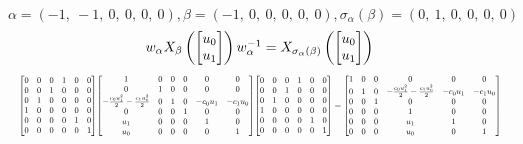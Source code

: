 \documentclass[11pt]{article}
\theoremstyle{definition}
\begin{document}
\[
\alpha = \left( -1, \  -1, \  0, \  0, \  0, \  0\right), \beta = \left( -1, \  0, \  0, \  0, \  0, \  0\right), \sigma_{\alpha}(\beta) = \left( 0, \  1, \  0, \  0, \  0, \  0\right)
\]
\[
\scaletoalign{\textwidth}{w_{\alpha} X_{\beta}\left(\left[\begin{matrix}u_{0}\\u_{1}\end{matrix}\right]\right) w_{\alpha}^{-1} = X_{\sigma_{\alpha}\left(\beta\right)}\left(\left[\begin{matrix}u_{0}\\u_{1}\end{matrix}\right]\right)}
\]
\[
\scaletoalign{\textwidth}{{\left[\begin{matrix}0 & 0 & 0 & 1 & 0 & 0\\0 & 0 & 1 & 0 & 0 & 0\\0 & 1 & 0 & 0 & 0 & 0\\1 & 0 & 0 & 0 & 0 & 0\\0 & 0 & 0 & 0 & 1 & 0\\0 & 0 & 0 & 0 & 0 & 1\end{matrix}\right]} {\left[\begin{matrix}1 & 0 & 0 & 0 & 0 & 0\\0 & 1 & 0 & 0 & 0 & 0\\- \frac{c_{0} u_{1}^{2}}{2} - \frac{c_{1} u_{0}^{2}}{2} & 0 & 1 & 0 & - c_{0} u_{1} & - c_{1} u_{0}\\0 & 0 & 0 & 1 & 0 & 0\\u_{1} & 0 & 0 & 0 & 1 & 0\\u_{0} & 0 & 0 & 0 & 0 & 1\end{matrix}\right]} {\left[\begin{matrix}0 & 0 & 0 & 1 & 0 & 0\\0 & 0 & 1 & 0 & 0 & 0\\0 & 1 & 0 & 0 & 0 & 0\\1 & 0 & 0 & 0 & 0 & 0\\0 & 0 & 0 & 0 & 1 & 0\\0 & 0 & 0 & 0 & 0 & 1\end{matrix}\right]} = {\left[\begin{matrix}1 & 0 & 0 & 0 & 0 & 0\\0 & 1 & 0 & - \frac{c_{0} u_{1}^{2}}{2} - \frac{c_{1} u_{0}^{2}}{2} & - c_{0} u_{1} & - c_{1} u_{0}\\0 & 0 & 1 & 0 & 0 & 0\\0 & 0 & 0 & 1 & 0 & 0\\0 & 0 & 0 & u_{1} & 1 & 0\\0 & 0 & 0 & u_{0} & 0 & 1\end{matrix}\right]}}
\]
\end{document}
